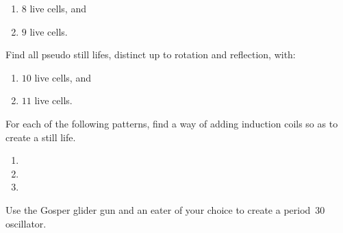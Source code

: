 \begin{multicols}{2}
\begin{problem}
		\begin{enumerate}[label=\bf\color{ocre}(\alph*)]
			\item $8$ live cells, and
			
			\item $9$ live cells.
		\end{enumerate}
	\end{problem}
	
	
	\mfilbreak
	
	
	\begin{problem}\label{exer:small_pseudo_still_lifes} 
		Find all pseudo still lifes, distinct up to rotation and reflection, with:\smallskip
		
		\begin{enumerate}[label=\bf\color{ocre}(\alph*)]
			\item $10$ live cells, and
			
			\item $11$ live cells.
		\end{enumerate}
	\end{problem}
	
	
	\mfilbreak
	
	
	\begin{problemstar}\label{exer:still_life_add_coil} 
		For each of the following patterns, find a way of adding induction coils so as to create a still life.\vspace*{-0.25cm}
		
		\begin{multicols}{2}\setlength{\columnsep}{1pt}
			\begin{enumerate}[label=(\alph*),series=exer_induction_coil]
				\item[\bf\color{ocre}(a)] 
				
				\item[\bf\color{ocre}(c)] 
				
				\item[\bf\color{ocre}(b)] 
			\end{enumerate}
		\end{multicols}
	\end{problemstar}
	
	
	\mfilbreak
	
	
	\begin{problem}\label{exer:gosper_oscillator} 
		Use the Gosper glider gun and an eater of your choice to create a period~30 oscillator.
	\end{problem}
	

\end{multicols}
